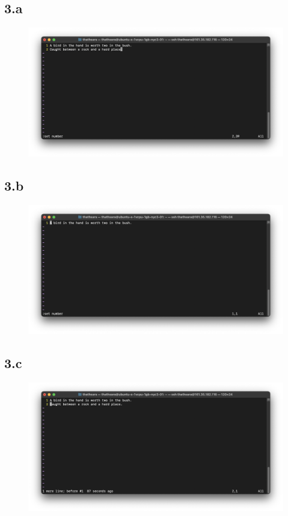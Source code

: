 \documentclass{article}
\begin{document}
    \subsection*{3.a}
    \begin{figure}[H]
        \centering
        \includegraphics[width=\textwidth]{1/3_a.png}
    \end{figure}

    \subsection*{3.b}
    \begin{figure}[H]
        \centering
        \includegraphics[width=\textwidth]{1/3_b.png}
    \end{figure}

    \subsection*{3.c}
    \begin{figure}[H]
        \centering
        \includegraphics[width=\textwidth]{1/3_c.png}
    \end{figure}
\end{document}
